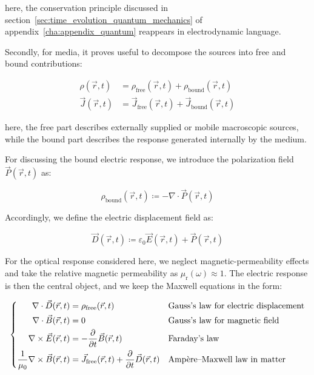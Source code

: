 here, the conservation principle discussed in section~\ref{sec:time_evolution_quantum_mechanics} of appendix~\ref{cha:appendix_quantum} reappears in electrodynamic language.

Secondly, for media, it proves useful to decompose the sources into free and bound contributions:

\begin{equation}
\begin{aligned}
    \rho(\vec{r},t) &= \rho_\mathrm{free}(\vec{r},t)+\rho_\mathrm{bound}(\vec{r},t) \\
    \vec{J}(\vec{r},t) &= \vec{J}_\mathrm{free}(\vec{r},t)+\vec{J}_\mathrm{bound}(\vec{r},t)
\end{aligned}
\label{free_and_bound_source_decomposition}
\end{equation}

here, the free part describes externally supplied or mobile macroscopic sources,
while the bound part describes the response generated internally by the medium.

For discussing the bound electric response, we introduce the polarization field $\vec{P}(\vec{r},t)$ as:

\begin{equation}
    \rho_\mathrm{bound}(\vec{r},t)\coloneqq -\nabla\cdot\vec{P}(\vec{r},t)
\label{bound_charge_from_polarization}
\end{equation}

Accordingly, we define the electric displacement field as:

\begin{equation}
    \vec{D}(\vec{r},t)\coloneqq \varepsilon_0\vec{E}(\vec{r},t)+\vec{P}(\vec{r},t)
\label{electric_displacement_field_definition}
\end{equation}

For the optical response considered here, we neglect magnetic-permeability effects and take the relative magnetic permeability as $\mu_{\mathrm{r}}(\omega)\approx1$.
The electric response is then the central object, and we keep the Maxwell equations in the form:

\begin{equation}
\left\{\begin{aligned}
    \nabla\cdot\vec{D}(\vec{r},t) &= \rho_\mathrm{free}(\vec{r},t) 
    &&\space \text{Gauss's law for electric displacement} \\
    \nabla\cdot\vec{B}(\vec{r},t) &= 0 
    &&\space \text{Gauss's law for magnetic field} \\
    \nabla\times\vec{E}(\vec{r},t) &= -\frac{\partial}{\partial t}\vec{B}(\vec{r},t) 
    &&\space \text{Faraday's law} \\
    \frac{1}{\mu_0}\nabla\times\vec{B}(\vec{r},t) &= \vec{J}_\mathrm{free}(\vec{r},t)+\frac{\partial}{\partial t}\vec{D}(\vec{r},t)
    &&\space \text{Amp\`ere--Maxwell law in matter}
\end{aligned}\right.
\label{maxwell_equations_in_matter}
\end{equation}

